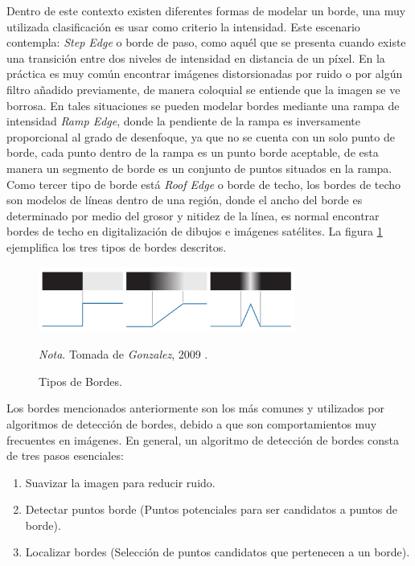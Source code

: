 Dentro de este contexto existen diferentes formas de modelar un borde, una muy utilizada clasificación es usar como criterio la intensidad. Este escenario contempla: \textit{Step Edge} o borde de paso, como aquél que se presenta cuando existe una transición entre dos niveles de intensidad en distancia de un píxel. En la práctica es muy común encontrar imágenes distorsionadas por ruido o por algún filtro añadido previamente, de manera coloquial se entiende que la imagen se ve borrosa. En tales situaciones se pueden modelar bordes mediante una rampa de intensidad \textit{Ramp Edge}, donde la pendiente de la rampa es inversamente proporcional al grado de desenfoque, ya que no se cuenta con un solo punto de borde, cada punto dentro de la rampa es un punto borde aceptable, de esta manera un segmento de borde es un conjunto de puntos situados en la rampa. Como tercer tipo de borde está \textit{Roof Edge} o borde de techo, los bordes de techo son modelos de líneas dentro de una región, donde el ancho del borde es determinado por medio del grosor y nitidez de la línea, es normal encontrar bordes de techo en digitalización de dibujos e imágenes satélites\cite{gonzalez2009digital}. La figura \ref{fig:edges_types} ejemplifica los tres tipos de bordes descritos.
\begin{figure}[h]
    \centering
    \includegraphics[width=0.75\textwidth]{Figures/Figures_Cap04/edge_type.png}
    \caption{Tipos de Bordes.}
    \textit{Nota}. Tomada de \textit{Gonzalez}, 2009 \cite{gonzalez2009digital}.
    \label{fig:edges_types}
\end{figure}

Los bordes mencionados anteriormente son los más comunes y utilizados por algoritmos de detección de bordes, debido a que son comportamientos muy frecuentes en imágenes. En general, un algoritmo de detección de bordes consta de tres pasos esenciales:
\begin{enumerate}
    \item Suavizar la imagen para reducir ruido.
    \item Detectar puntos borde (Puntos potenciales para ser candidatos a puntos de borde).
    \item Localizar bordes (Selección de puntos candidatos que pertenecen a un borde).
\end{enumerate}

